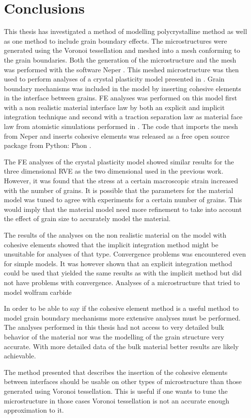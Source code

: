 \documentclass[conclusion.tex]{subfiles}
\begin{document}
\FloatBarrier

\chapter{Conclusions}


This thesis has investigated a method of modelling polycrystalline method as well as one method to include grain boundary effects. The microstructures were generated using the Voronoi tessellation and meshed into a mesh conforming to the grain boundaries. Both the generation of the microstructure and the mesh was performed with the software Neper \cite{Quey20111729}. This meshed microstructure was then used to perform analyses of a crystal plasticity model presented in \cite{lillekh}. Grain boundary mechanisms was included in the model by inserting cohesive elements in the interface between grains. FE analyses was performed on this model first with a non realistic material interface law by both an explicit and implicit integration technique and second with a traction separation law as material face law from atomistic simulations performed in \cite{Gren2013}. The code that imports the mesh from Neper and inserts cohesive elements was released as a free open source package from Python: Phon \cite{Phon}.

The FE analyses of the crystal plasticity model showed similar results for the three dimensional RVE as the two dimensional used in the previous work. However, it was found that the stress at a certain macroscopic strain increased with the number of grains. It is possible that the parameters for the material model was tuned to agree with experiments for a certain number of grains. This would imply that the material model need more refinement to take into account the effect of grain size to accurately model the material.

The results of the analyses on the non realistic material on the model with cohesive elements showed that the implicit integration method might be unsuitable for analyses of that type. Convergence problems was encountered even for simple models. It was however shown that an explicit integration method could be used that yielded the same results as with the implicit method but did not have problems with convergence. Analyses of a microstructure that tried to model wolfram carbide 

In order to be able to say if the cohesive element method is a useful method to model grain boundary mechanisms more extensive analyses must be performed. The analyses performed in this thesis had not access to very detailed bulk behavior of the material nor was the modelling of the grain structure very accurate. With more detailed data of the bulk material better results are likely achievable.

 The method presented that describes the insertion of the cohesive elements between interfaces should be usable on other types of microstructure than those generated using Voronoi tessellation. This is useful if one wants to tune the microstructure in those cases Voronoi tessellation is not an accurate enough approximation to it.  
\end{document}
